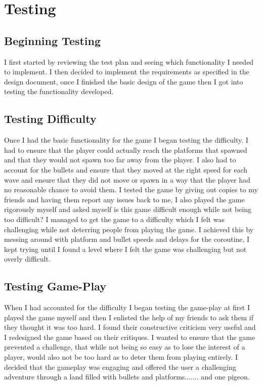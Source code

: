 \documentclass{report}
\begin{document}
\chapter{Testing}
\section{Beginning Testing}
I first started by reviewing the test plan and seeing which functionality I needed to implement. I then decided to implement the requirements as specified in the design document, once I finished the basic design of the game then I got into testing the functionality developed.
\section{Testing Difficulty}
Once I had the basic functionality for the game I began testing the difficulty.  I had to ensure that the player could actually reach the platforms that spawned and that they would not spawn too far away from the player.  I also had to account for the bullets and ensure that they moved at the right speed for each wave and ensure that they did not move or spawn in a way that the player had no reasonable chance to avoid them.  I tested the game by giving out copies to my friends and having them report any issues back to me, I also played the game rigorously myself and asked myself is this game difficult enough while not being too difficult? I managed to get the game to a difficulty which I felt was challenging while not deterring people from playing the game. I achieved this by messing around with platform and bullet speeds and delays for the coroutine, I kept trying until I found a level where I felt the game was challenging but not overly difficult.
\section{Testing Game-Play}
When I had accounted for the difficulty I began testing the game-play at first I played the game myself and then I enlisted the help of my friends to ask them if they thought it was too hard.  I found their constructive criticism very useful and I redesigned the game based on their critiques.  I wanted to ensure that the game prevented a challenge, that while not being so easy as to lose the interest of a player, would also not be too hard as to deter them from playing entirely.  I decided that the gameplay was engaging and offered the user a challenging adventure through a land filled with bullets and platforms....... and one pigeon.
\end{document}
